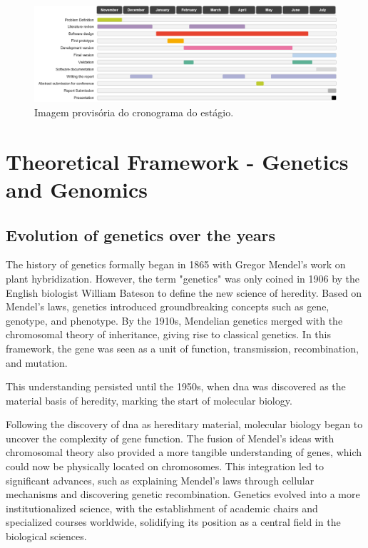 \begin{figure}[H]
    \centering
    \includegraphics[width=1\textwidth]{figs/timeline2.png}
    \caption{Imagem provisória do cronograma do estágio.}
    \label{fig:timeline}
\end{figure}

\section{Theoretical Framework - Genetics and Genomics} \label{sec:intro_theoretical}
\subsection{Evolution of genetics over the years} \label{subsec:genetics_evolution}

The history of genetics formally began in 1865 with Gregor Mendel's work on plant hybridization. However, the term "genetics" was only coined in 1906 by the English biologist William Bateson to define the new science of heredity. Based on Mendel's laws, genetics introduced groundbreaking concepts such as gene, genotype, and phenotype. By the 1910s, Mendelian genetics merged with the chromosomal theory of inheritance, giving rise to classical genetics. In this framework, the gene was seen as a unit of function, transmission, recombination, and mutation. \cite{genetictimeline2}

This understanding persisted until the 1950s, when \ac{dna} was discovered as the material basis of heredity, marking the start of molecular biology. \cite{Gayon2016}

Following the discovery of \ac{dna} as hereditary material, molecular biology began to uncover the complexity of gene function. The fusion of Mendel's ideas with chromosomal theory also provided a more tangible understanding of genes, which could now be physically located on chromosomes. This integration led to significant advances, such as explaining Mendel's laws through cellular mechanisms and discovering genetic recombination. Genetics evolved into a more institutionalized science, with the establishment of academic chairs and specialized courses worldwide, solidifying its position as a central field in the biological sciences. \cite{Gayon2016}

